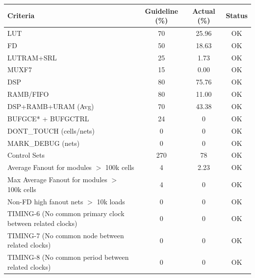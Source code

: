 \documentclass{article}
\begin{document}
\begin{table}[H]
    \centering
    \begin{tabular}{|l|c|c|c|}
    \hline
    \textbf{Criteria} & \textbf{Guideline (\%)} & \textbf{Actual (\%)} & \textbf{Status} \\ \hline
    LUT               & 70                      & 25.96               & OK              \\ \hline
    FD                & 50                      & 18.63               & OK              \\ \hline
    LUTRAM+SRL        & 25                      & 1.73                & OK              \\ \hline
    MUXF7             & 15                      & 0.00                & OK              \\ \hline
    DSP               & 80                      & 75.76               & OK              \\ \hline
    RAMB/FIFO         & 80                      & 11.00               & OK              \\ \hline
    DSP+RAMB+URAM (Avg) & 70                    & 43.38               & OK              \\ \hline
    BUFGCE* + BUFGCTRL & 24                     & 0                   & OK              \\ \hline
    DONT\_TOUCH (cells/nets) & 0               & 0                   & OK              \\ \hline
    MARK\_DEBUG (nets) & 0                     & 0                   & OK              \\ \hline
    Control Sets      & 270                     & 78                  & OK              \\ \hline
    Average Fanout for modules $>$ 100k cells & 4 & 2.23            & OK              \\ \hline
    Max Average Fanout for modules $>$ 100k cells & 4 & 0            & OK              \\ \hline
    Non-FD high fanout nets $>$ 10k loads & 0    & 0                   & OK              \\ \hline
    TIMING-6 (No common primary clock between related clocks)          & 0                  & 0               & OK              \\ \hline
    TIMING-7 (No common node between related clocks)                   & 0                  & 0               & OK              \\ \hline
    TIMING-8 (No common period between related clocks)                 & 0                  & 0               & OK              \\ \hline

\end{tabular}
\end{table}
\end{document}
